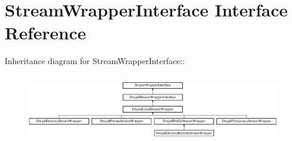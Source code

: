 \hypertarget{interfaceStreamWrapperInterface}{
\section{StreamWrapperInterface Interface Reference}
\label{interfaceStreamWrapperInterface}
}
Inheritance diagram for StreamWrapperInterface::\begin{figure}[H]
\begin{center}
\leavevmode
\includegraphics[height=3.07018cm]{interfaceStreamWrapperInterface}
\end{center}
\end{figure}
